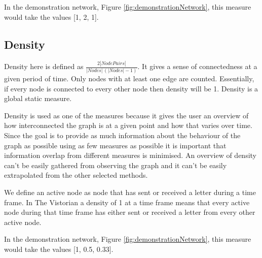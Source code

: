 In the demonstration network, Figure \ref{fig:demonstrationNetwork}, this measure would take the values [1, 2, 1]. 

\subsection{Density}
Density here is defined as $\frac{2|NodePairs|}{|Nodes|\,(|Nodes|-1)}$. It gives a sense of connectedness at a given period of time. Only nodes with at least one edge are counted. Essentially, if every node is connected to every other node then density will be 1. Density is a global static measure.

Density is used as one of the measures because it gives the user an overview of how interconnected the graph is at a given point and how that varies over time. Since the goal is to provide as much information about the behaviour of the graph as possible using as few measures as possible it is important that information overlap from different measures is minimised. An overview of density can't be easily gathered from observing the graph and it can't be easily extrapolated from the other selected methods.

We define an active node as node that has sent or received a letter during a time frame. In The Vistorian a density of 1 at a time frame means that every active node during that time frame has either sent or received a letter from every other active node.

In the demonstration network, Figure \ref{fig:demonstrationNetwork}, this measure would take the values [1, 0.5, 0.33]. 


